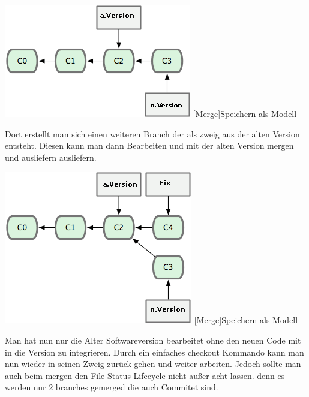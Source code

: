 \documentclass[12pt,a4paper,bibliography=totocnumbered,listof=totocnumbered]{scrartcl}
\begin{document}
\vspace{1em}
\begin{minipage}{\linewidth}
	\centering
	\includegraphics[width=0.6\linewidth]{Bilder/merge.png}
	[Merge]{Speichern als Modell\footnotemark }
	\label{fig:gitspeichern}
\end{minipage} 	
\newpage
Dort erstellt man sich einen weiteren Branch der als zweig aus der alten Version entsteht. Diesen kann man dann Bearbeiten und mit der alten Version mergen und ausliefern ausliefern.
 
\vspace{1em}
\begin{minipage}{\linewidth}
	\centering
	\includegraphics[width=0.6\linewidth]{Bilder/merge-fix.png}
	[Merge]{Speichern als Modell\footnotemark }
	\label{fig:gitspeichern}
\end{minipage}
Man hat nun nur die Alter Softwareversion bearbeitet ohne den neuen Code
mit in die Version zu integrieren. Durch ein einfaches checkout Kommando kann man nun wieder in seinen Zweig zurück gehen und weiter arbeiten. Jedoch sollte man auch beim mergen den File Status Lifecycle nicht außer acht lassen. denn es werden nur 2 branches gemerged die auch Commitet sind.
\pagebreak
\end{document}
